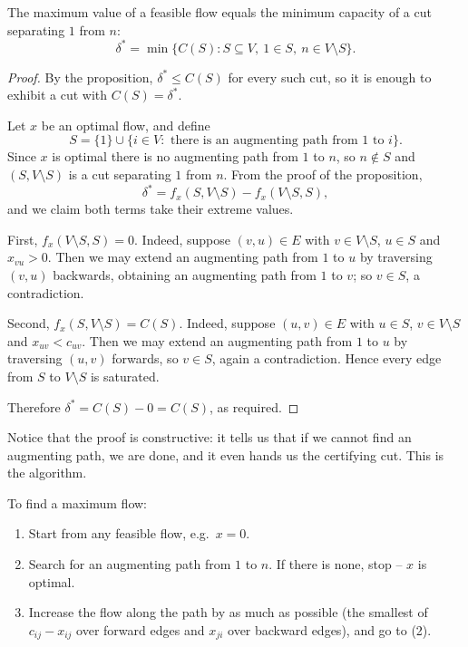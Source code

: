 \documentclass[a4paper]{scrartcl}
\begin{document}
\begin{theorem}
    The maximum value of a feasible flow equals the minimum capacity of a cut separating $1$ from $n$:
    $$
    \delta^* = \min\{C(S) : S \subseteq V,\ 1 \in S,\ n \in V\setminus S\}.
    $$
\end{theorem}
\begin{proof}
    By the proposition, $\delta^* \leq C(S)$ for every such cut, so it is enough to exhibit a cut with $C(S) = \delta^*$.

    Let $x$ be an optimal flow, and define
    $$
    S = \{1\}\cup\{i \in V : \text{ there is an augmenting path from } 1 \text{ to } i\}.
    $$
    Since $x$ is optimal there is no augmenting path from $1$ to $n$, so $n \notin S$ and $(S, V\setminus S)$ is a cut separating $1$ from $n$. From the proof of the proposition,
    $$
    \delta^* = f_x(S, V\setminus S) - f_x(V\setminus S, S),
    $$
    and we claim both terms take their extreme values.

    First, $f_x(V\setminus S, S) = 0$. Indeed, suppose $(v, u) \in E$ with $v \in V\setminus S$, $u \in S$ and $x_{vu} > 0$. Then we may extend an augmenting path from $1$ to $u$ by traversing $(v,u)$ backwards, obtaining an augmenting path from $1$ to $v$; so $v \in S$, a contradiction.

    Second, $f_x(S, V\setminus S) = C(S)$. Indeed, suppose $(u, v)\in E$ with $u \in S$, $v \in V\setminus S$ and $x_{uv} < c_{uv}$. Then we may extend an augmenting path from $1$ to $u$ by traversing $(u,v)$ forwards, so $v \in S$, again a contradiction. Hence every edge from $S$ to $V\setminus S$ is saturated.

    Therefore $\delta^* = C(S) - 0 = C(S)$, as required.
\end{proof}

Notice that the proof is constructive: it tells us that if we cannot find an augmenting path, we are done, and it even hands us the certifying cut. This is the algorithm.

\begin{definition}
    To find a maximum flow:
    \begin{enumerate}[label=(\arabic*)]
        \item Start from any feasible flow, e.g.\ $x = 0$.
        \item Search for an augmenting path from $1$ to $n$. If there is none, stop -- $x$ is optimal.
        \item Increase the flow along the path by as much as possible (the smallest of $c_{ij} - x_{ij}$ over forward edges and $x_{ji}$ over backward edges), and go to (2).
    \end{enumerate}
\end{definition}
\end{document}
